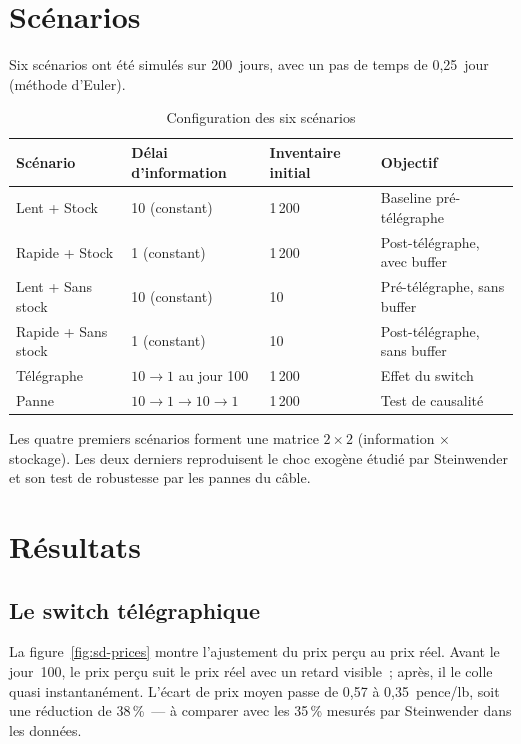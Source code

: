 \section{Scénarios}

Six scénarios ont été simulés sur 200~jours, avec un pas de temps de 0,25~jour (méthode d'Euler).

\begin{table}[htbp]
\caption{Configuration des six scénarios}\label{tab:sd-scenarios}
\centering\small
\begin{tabular}{llll}
\toprule
\textbf{Scénario} & \textbf{Délai d'information} & \textbf{Inventaire initial} & \textbf{Objectif} \\
\midrule
Lent + Stock & 10 (constant) & 1\,200 & Baseline pré-télégraphe \\
Rapide + Stock & 1 (constant) & 1\,200 & Post-télégraphe, avec buffer \\
Lent + Sans stock & 10 (constant) & 10 & Pré-télégraphe, sans buffer \\
Rapide + Sans stock & 1 (constant) & 10 & Post-télégraphe, sans buffer \\
Télégraphe & $10 \to 1$ au jour 100 & 1\,200 & Effet du switch \\
Panne & $10 \to 1 \to 10 \to 1$ & 1\,200 & Test de causalité \\
\bottomrule
\end{tabular}
\end{table}

Les quatre premiers scénarios forment une matrice $2 \times 2$ (information $\times$ stockage). Les deux derniers reproduisent le choc exogène étudié par Steinwender et son test de robustesse par les pannes du câble.


\section{Résultats}

\subsection{Le switch télégraphique}

La figure~\ref{fig:sd-prices} montre l'ajustement du prix perçu au prix réel. Avant le jour~100, le prix perçu suit le prix réel avec un retard visible~; après, il le colle quasi instantanément. L'écart de prix moyen passe de 0,57 à 0,35~pence/lb, soit une réduction de 38\,\%~--- à comparer avec les 35\,\% mesurés par Steinwender dans les données.

